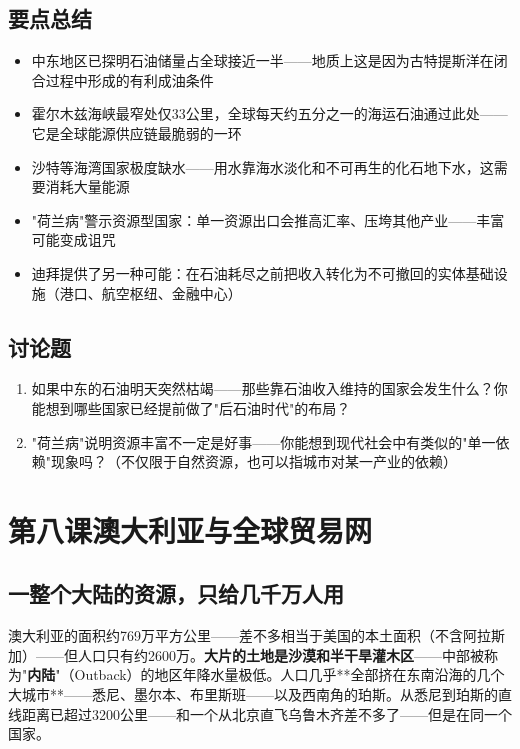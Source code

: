 \documentclass[a4paper,12pt]{ctexart}
\begin{document}
\subsection*{要点总结}
\begin{itemize}
  \item 中东地区已探明石油储量占全球接近一半——地质上这是因为古特提斯洋在闭合过程中形成的有利成油条件
  \item 霍尔木兹海峡最窄处仅33公里，全球每天约五分之一的海运石油通过此处——它是全球能源供应链最脆弱的一环
  \item 沙特等海湾国家极度缺水——用水靠海水淡化和不可再生的化石地下水，这需要消耗大量能源
  \item "荷兰病"警示资源型国家：单一资源出口会推高汇率、压垮其他产业——丰富可能变成诅咒
  \item 迪拜提供了另一种可能：在石油耗尽之前把收入转化为不可撤回的实体基础设施（港口、航空枢纽、金融中心）
\end{itemize}

\subsection*{讨论题}
\begin{enumerate}
  \item 如果中东的石油明天突然枯竭——那些靠石油收入维持的国家会发生什么？你能想到哪些国家已经提前做了"后石油时代"的布局？
  \item "荷兰病"说明资源丰富不一定是好事——你能想到现代社会中有类似的"单一依赖"现象吗？（不仅限于自然资源，也可以指城市对某一产业的依赖）
\end{enumerate}

\newpage

\section{\textcolor{orange!80!black}{第八课\quad 澳大利亚与全球贸易网}}

\subsection*{一整个大陆的资源，只给几千万人用}

澳大利亚的面积约769万平方公里——差不多相当于美国的本土面积（不含阿拉斯加）——但人口只有约2600万。\textbf{大片的土地是沙漠和半干旱灌木区}——中部被称为"\textbf{内陆}"（Outback）的地区年降水量极低。人口几乎**全部挤在东南沿海的几个大城市**——悉尼、墨尔本、布里斯班——以及西南角的珀斯。从悉尼到珀斯的直线距离已超过3200公里——和一个从北京直飞乌鲁木齐差不多了——但是在同一个国家。
\end{document}
